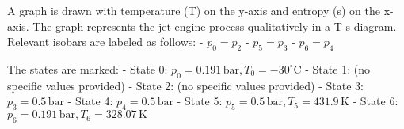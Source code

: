 A graph is drawn with temperature (T) on the y-axis and entropy (s) on the x-axis. The graph represents the jet engine process qualitatively in a T-s diagram. Relevant isobars are labeled as follows:  
- \( p_0 = p_2 \)  
- \( p_5 = p_3 \)  
- \( p_6 = p_4 \)  

The states are marked:  
- State 0: \( p_0 = 0.191 \, \text{bar}, T_0 = -30^\circ \text{C} \)  
- State 1: (no specific values provided)  
- State 2: (no specific values provided)  
- State 3: \( p_3 = 0.5 \, \text{bar} \)  
- State 4: \( p_4 = 0.5 \, \text{bar} \)  
- State 5: \( p_5 = 0.5 \, \text{bar}, T_5 = 431.9 \, \text{K} \)  
- State 6: \( p_6 = 0.191 \, \text{bar}, T_6 = 328.07 \, \text{K} \)